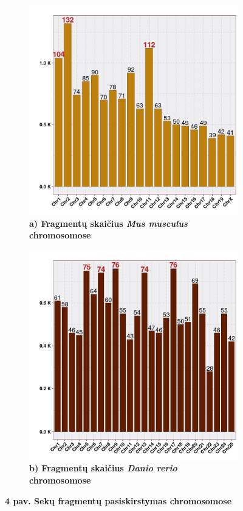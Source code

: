 \documentclass[12pt]{article}
\begin{document}
\begin{figure}[htb]
    \centering
    \begin{subfigure}[b]{0.45\textwidth}
        \centering
        \includegraphics[width=\textwidth]{../Figures/Synteny_Chr_MM.png}
        \caption*{\centering\small\textbf{a) Fragmentų skaičius \emph{Mus musculus} chromosomose}}
    \end{subfigure}
    \hfill
    \begin{subfigure}[b]{0.45\textwidth}
        \centering
        \includegraphics[width=\textwidth]{../Figures/Synteny_Chr_DR.png}
        \caption*{\centering\small\textbf{b) Fragmentų skaičius \emph{Danio rerio} chromosomose}}
    \end{subfigure}
    \caption*{\small\textbf{4 pav. Sekų fragmentų pasiskirstymas chromosomose}}
    \label{fig:birds}
\end{figure}
\end{document}
